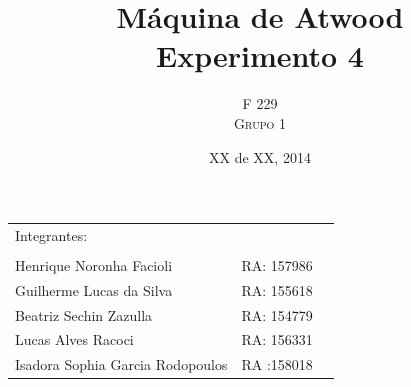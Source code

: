 \documentclass[a4paper]{article}
\title{Máquina de Atwood \\ Experimento 4} %
\author{F 229 \\ \textsc{Grupo 1}}
\date{XX de XX, 2014}
\begin{document}
\maketitle

\begin{center}
	\begin{tabular}{l r l}
		Integrantes:\\\\
		 Henrique Noronha Facioli & RA: 157986 \\
		 Guilherme Lucas da Silva & RA: 155618 \\
		 Beatriz Sechin Zazulla & RA: 154779 \\
		 Lucas Alves Racoci & RA: 156331 \\
		 Isadora Sophia Garcia Rodopoulos & RA :158018 \\
	\end{tabular}
\end{center}

\end{document}
